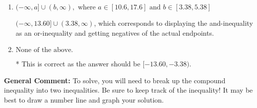 \documentclass{extbook}[14pt]
\begin{document}
\begin{enumerate}
{\begin{enumerate}[label=\Alph*.]
$[13.60, 3.38)$, which is the correct interval but negatives of the actual endpoints.
\item \( (-\infty, a] \cup (b, \infty), \text{ where } a \in [10.6, 17.6] \text{ and } b \in [3.38, 5.38] \)

$(-\infty, 13.60] \cup (3.38, \infty)$, which corresponds to displaying the and-inequality as an or-inequality and getting negatives of the actual endpoints.
\item \( \text{None of the above.} \)

* This is correct as the answer should be $[-13.60, -3.38)$.
\end{enumerate}

\textbf{General Comment:} To solve, you will need to break up the compound inequality into two inequalities. Be sure to keep track of the inequality! It may be best to draw a number line and graph your solution.
}
\end{enumerate}
\end{document}
